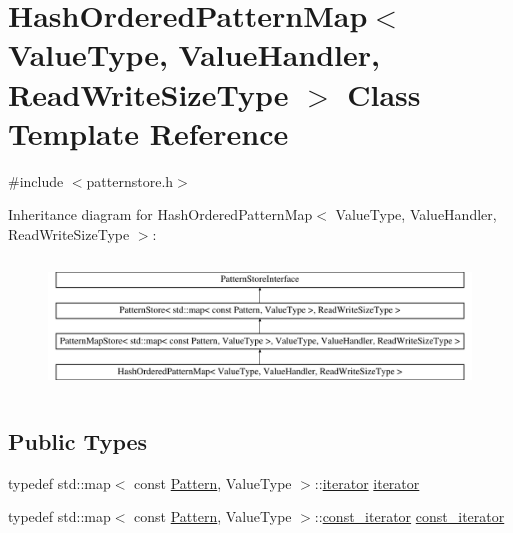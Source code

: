 \hypertarget{classHashOrderedPatternMap}{}\section{Hash\+Ordered\+Pattern\+Map$<$ Value\+Type, Value\+Handler, Read\+Write\+Size\+Type $>$ Class Template Reference}
\label{classHashOrderedPatternMap}


{\ttfamily \#include $<$patternstore.\+h$>$}

Inheritance diagram for Hash\+Ordered\+Pattern\+Map$<$ Value\+Type, Value\+Handler, Read\+Write\+Size\+Type $>$\+:\begin{figure}[H]
\begin{center}
\leavevmode
\includegraphics[height=3.561208cm]{classHashOrderedPatternMap}
\end{center}
\end{figure}
\subsection*{Public Types}
\begin{DoxyCompactItemize}
\item 
typedef std\+::map$<$ const \hyperlink{classPattern}{Pattern}, Value\+Type $>$\+::\hyperlink{classHashOrderedPatternMap_a149481ae49379713dae0ffcaff294f65}{iterator} \hyperlink{classHashOrderedPatternMap_a149481ae49379713dae0ffcaff294f65}{iterator}
\item 
typedef std\+::map$<$ const \hyperlink{classPattern}{Pattern}, Value\+Type $>$\+::\hyperlink{classHashOrderedPatternMap_a0162fc35654440e11ea66e71e8ffe8f8}{const\+\_\+iterator} \hyperlink{classHashOrderedPatternMap_a0162fc35654440e11ea66e71e8ffe8f8}{const\+\_\+iterator}
\end{DoxyCompactItemize}
